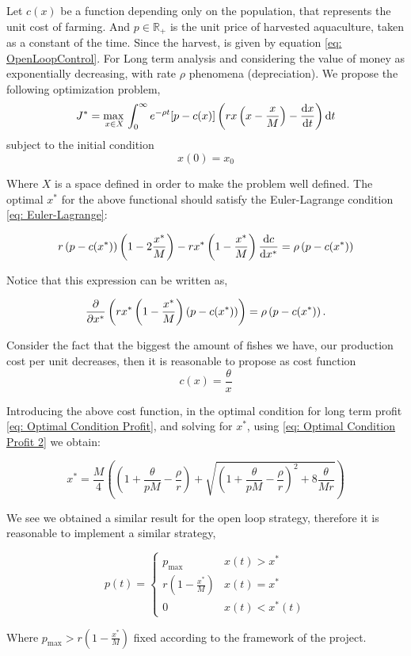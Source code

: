 Let $c(x)$ be a function depending only on the population, that represents the unit cost of farming. And $p\in\mathbb{R_+}$ is the unit price of harvested aquaculture, taken as a constant of the time. Since the harvest, is given by equation \ref{eq: OpenLoopControl}. For Long term analysis and considering the value of money as exponentially decreasing, with rate $\rho$ phenomena (depreciation). We propose the following optimization problem,
\begin{equation}
{J}^{\ast}={\displaystyle {\underset {x\in X}{\max\, }}\int_{0}^{\infty} e^{-\rho t}[p-c(x)]\left(rx\left(x-\frac{x}{M}\right)-\frac{\mathrm{d} x}{{\mathrm{d} t}}\right) \mathrm{d} t }
\end{equation}
subject to the initial condition
\begin{equation}
	x(0)=x_0
\end{equation}

Where $X$ is a space defined in order to make the problem well defined. The optimal $x^*$ for the above functional should satisfy the Euler-Lagrange condition \ref{eq: Euler-Lagrange}:

\begin{equation}
r\left(p-c(x^*)\right)\left(1-2\frac{x^*}{M}\right)-rx^*\left(1-\frac{x^*}{M}\right)\frac{\mathrm{d} c}{{\mathrm{d} x^*}}=\rho\left(p-c(x^*)\right) \label{eq: Optimal Condition Profit}
\end{equation}

Notice that this expression can be written as,

\begin{equation}
	\frac{\partial }{{\partial x^*}}\left(rx^*\left(1-\frac{x^*}{M}\right)\left(p-c(x^*)\right)\right)=\rho\left(p-c(x^*)\right). \label{eq: Optimal Condition Profit 2}
\end{equation}

Consider the fact that the biggest the amount of fishes we have, our production cost per unit decreases, then it is reasonable to propose as cost function
\begin{equation}
	c(x)=\frac{\theta}{x}
\end{equation}

Introducing the above cost function, in the optimal condition for long term profit \ref{eq: Optimal Condition Profit}, and solving for $x^*$, using \ref{eq: Optimal Condition Profit 2} we obtain:

\begin{equation}
	x^*= \frac{M}{4}\left( \left(1+\frac{\theta}{pM}-\frac{\rho}{r}\right) +\sqrt{ \left(1+\frac{\theta}{p M}-\frac{\rho}{r}\right)^2+ 8\frac{\theta}{Mr}}\right)
\end{equation}

We see we obtained a similar result for the open loop strategy, therefore it is reasonable to implement a similar strategy,

\begin{equation}
	p(t)=\begin{cases}
		p_{\max}& x(t)>x^*\\
		r\left(1-\frac{x^*}{M}\right) & x(t)=x^*\\
		0 & x(t)<x^*(t)
	\end{cases}
\end{equation}

Where $p_{\max}>r\left(1-\frac{x^*}{M}\right)$ fixed according to the framework of the project.